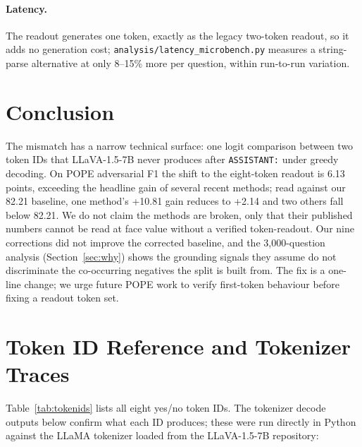 \documentclass{article}
\begin{document}
\paragraph{Latency.} The readout generates one token, exactly as the
legacy two-token readout, so it adds no generation cost;
\texttt{analysis/latency\_microbench.py} measures a string-parse
alternative at only 8--15\% more per question, within run-to-run
variation.

\section{Conclusion}
\label{sec:conclusion}

The mismatch has a narrow technical surface: one logit comparison
between two token IDs that LLaVA-1.5-7B never produces after
\texttt{ASSISTANT:} under greedy decoding. On POPE adversarial F1 the
shift to the eight-token readout is 6.13 points, exceeding the headline
gain of several recent methods; read against our 82.21 baseline, one
method's +10.81 gain reduces to +2.14 and two others fall below 82.21.
We do not claim the methods are broken, only that their published
numbers cannot be read at face value without a verified token-readout.
Our nine corrections did not improve the corrected baseline, and the
3{,}000-question analysis (Section~\ref{sec:why}) shows the grounding
signals they assume do not discriminate the co-occurring negatives the
split is built from. The fix is a one-line change; we urge future POPE
work to verify first-token behaviour before fixing a readout token set.





\newpage


\appendix

\section{Token ID Reference and Tokenizer Traces}
\label{app:tokens}

Table~\ref{tab:tokenids} lists all eight yes/no token IDs. The tokenizer
decode outputs below confirm what each ID produces; these were run
directly in Python against the LLaMA tokenizer loaded from the
LLaVA-1.5-7B repository:
\end{document}
